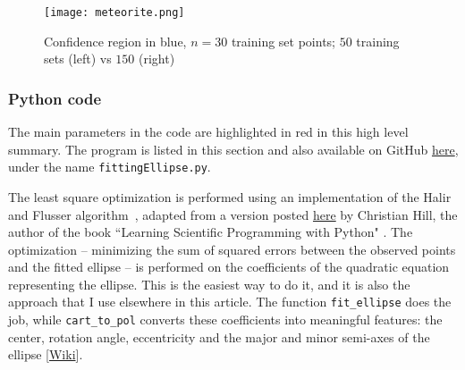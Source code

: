 \documentclass[oneside,10pt]{book}
\begin{document}
\begin{figure}[H]
\centering
\texttt{[image: meteorite.png]}  
\caption{Confidence region in blue, $n=30$ training set points; $50$ training sets (left) vs $150$ (right)}
\label{fig:meteor}
\end{figure}




\subsubsection{Python code}\label{pipybv}

The main parameters in the code are highlighted in red in this high level summary. The program 
  is listed in this section and also available on GitHub 
\href{https://github.com/VincentGranville/Machine-Learning/blob/main/Source\%20Code/fittingEllipse.py}{here},
 under the name \texttt{fittingEllipse.py}.

The least square optimization is performed using an implementation of  the Halir and Flusser algorithm~\cite{Halir98numericallystable}, adapted from a version posted 
 \href{https://scipython.com/blog/direct-linear-least-squares-fitting-of-an-ellipse/}{here} by Christian Hill, the author of the book
``Learning Scientific Programming with Python" \cite{chsp2016}. The optimization -- minimizing the sum of squared errors between the observed points and the fitted ellipse -- is performed on the coefficients of the quadratic equation representing the ellipse.
 This is the easiest way to do it, and it is also the approach that I use elsewhere in this article. 
 The function \texttt{fit\_ellipse} does the job, while \texttt{cart\_to\_pol} converts these coefficients into meaningful features: the center, rotation angle, eccentricity and the major and minor semi-axes of the ellipse [\href{https://simple.wikipedia.org/wiki/Semi-major_and_semi-minor_axes}{Wiki}]. \vspace{1ex}

 
\vspace{1ex}
\end{document}
